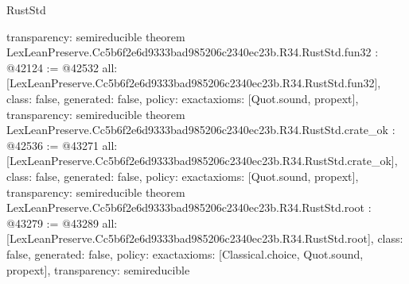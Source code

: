 \begin{lexlean}{RustStd}
\begin{coremodule}
{  transparency: semireducible
}
theorem LexLeanPreserve.Cc5b6f2e6d9333bad985206c2340ec23b.R34.RustStd.fun32 : @42124 := @42532 {
  all: [LexLeanPreserve.Cc5b6f2e6d9333bad985206c2340ec23b.R34.RustStd.fun32],
  class: false,
  generated: false,
  policy: exact{axioms: [Quot.sound, propext]},
  transparency: semireducible
}
theorem LexLeanPreserve.Cc5b6f2e6d9333bad985206c2340ec23b.R34.RustStd.crate_ok : @42536 := @43271 {
  all: [LexLeanPreserve.Cc5b6f2e6d9333bad985206c2340ec23b.R34.RustStd.crate_ok],
  class: false,
  generated: false,
  policy: exact{axioms: [Quot.sound, propext]},
  transparency: semireducible
}
theorem LexLeanPreserve.Cc5b6f2e6d9333bad985206c2340ec23b.R34.RustStd.root : @43279 := @43289 {
  all: [LexLeanPreserve.Cc5b6f2e6d9333bad985206c2340ec23b.R34.RustStd.root],
  class: false,
  generated: false,
  policy: exact{axioms: [Classical.choice, Quot.sound, propext]},
  transparency: semireducible
}


\end{coremodule}
\end{lexlean}
